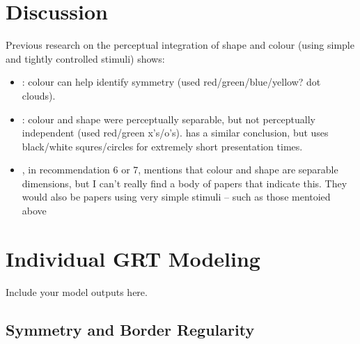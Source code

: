 \documentclass[man, 12pt, a4paper,  donotrepeattitle, floatsintext, draftfirst]{apa7}
\begin{document}





\section{Discussion}
Previous research on the perceptual integration of shape and colour (using simple and tightly controlled stimuli) shows:
\begin{itemize}
    \item \cite{gheorghiu2016role}: colour can help identify symmetry (used red/green/blue/yellow? dot clouds).
    \item \cite{fitousi2018feature}: colour and shape were perceptually separable, but not perceptually independent (used red/green x's/o's). \cite{cohen1997visual} has a similar conclusion, but uses black/white squres/circles for extremely short presentation times.
    \item \cite{soto2017testing}, in recommendation 6 or 7, mentions that colour and shape are separable dimensions, but I can't really find a body of papers that indicate this. They would also be papers using very simple stimuli -- such as those mentoied above
\end{itemize}

\newpage
\printbibliography

\newpage
\appendix
\section{Individual GRT Modeling}
\label{appendix:ind_fits}
Include your model outputs here.
\subsection{Symmetry and Border Regularity}
\end{document}
